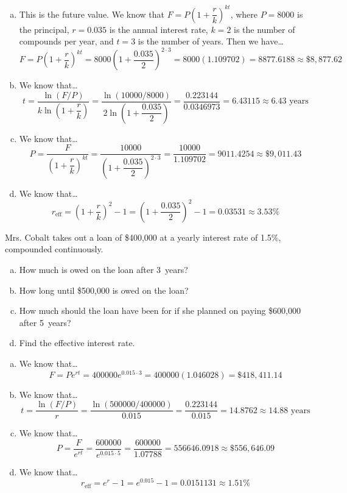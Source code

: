 \documentclass[11pt,letterpaper]{article}
\begin{document}
\sol
\begin{enumerate}[(a)]
\item This is the future value. We know that $F= P \left(1 + \dfrac{r}{k} \right)^{kt}$, where $P= 8000$ is the principal, $r= 0.035$ is the annual interest rate, $k= 2$ is the number of compounds per year, and $t= 3$ is the number of years. Then we have\dots
	\[
	F= P \left(1 + \dfrac{r}{k} \right)^{kt}= 8000 \left(1 + \dfrac{0.035}{2} \right)^{2 \cdot 3}= 8000(1.109702)= 8877.6188 \approx \$8,877.62
	\] \pspace

\item We know that\dots
	\[
	t= \dfrac{\ln(F/P)}{k \ln\left(1 + \dfrac{r}{k} \right)}= \dfrac{\ln(10000/8000)}{2 \ln \left(1 + \dfrac{0.035}{2} \right)}= \dfrac{0.223144}{0.0346973}= 6.43115 \approx 6.43 \text{ years}
	\] \pspace

\item We know that\dots
	\[
	P= \dfrac{F}{\left(1 + \dfrac{r}{k} \right)^{kt}}= \dfrac{10000}{\left(1 + \dfrac{0.035}{2} \right)^{2 \cdot 3}}= \dfrac{10000}{1.109702}= 9011.4254 \approx \$9,011.43
	\] \pspace

\item We know that\dots
	\[
	r_{\text{eff}}= \left(1 + \dfrac{r}{k} \right)^2 - 1= \left(1 + \dfrac{0.035}{2} \right)^2 - 1= 0.03531 \approx 3.53\%
	\]
\end{enumerate}



\newpage



 Mrs. Cobalt takes out a loan of \$400,000 at a yearly interest rate of 1.5\%, compounded continuously. 
	\begin{enumerate}[(a)]
	\item How much is owed on the loan after 3~years?
	\item How long until \$500,000 is owed on the loan?
	\item How much should the loan have been for if she planned on paying \$600,000 after 5~years?
	\item Find the effective interest rate.
	\end{enumerate} \pspace

\sol
\begin{enumerate}[(a)]
\item We know that\dots
	\[
	F= Pe^{rt}= 400000 e^{0.015 \cdot 3}= 400000 (1.046028)= \$418,411.14
	\] \pspace

\item We know that\dots
	\[
	t= \dfrac{\ln(F/P)}{r}= \dfrac{\ln(500000/400000)}{0.015}= \dfrac{0.223144}{0.015}= 14.8762 \approx 14.88 \text{ years}
	\] \pspace

\item We know that\dots
	\[
	P= \dfrac{F}{e^{rt}}= \dfrac{600000}{e^{0.015 \cdot 5}}= \dfrac{600000}{1.07788}= 556646.0918 \approx \$556,646.09
	\] \pspace

\item We know that\dots
	\[
	r_{\text{eff}}= e^r - 1= e^{0.015} - 1= 0.0151131 \approx 1.51\%
	\]
\end{enumerate}
\end{document}
